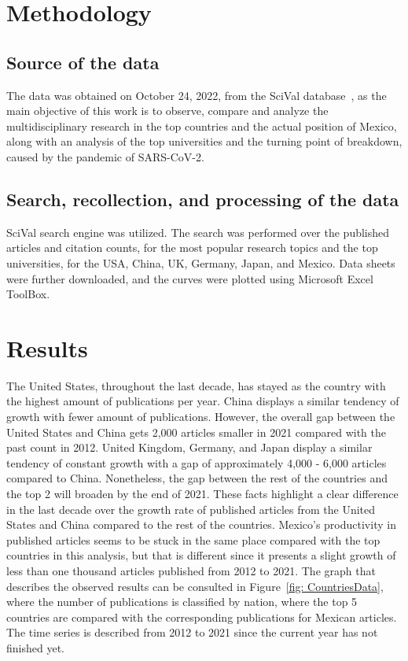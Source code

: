 \documentclass[conference]{IEEEtran}
\begin{document}
\section{Methodology}
\label{sec:Methodology}
\subsection{Source of the data}
The data was obtained on October 24, 2022, from the SciVal database~\cite{Scival2022}, as the main objective of this work is to observe, compare and analyze the multidisciplinary research in the top countries and the actual position of Mexico, along with an analysis of the top universities and the turning point of breakdown, caused by the pandemic of SARS-CoV-2.
\subsection{Search, recollection, and processing of the data}
SciVal search engine was utilized. The search was performed over the published articles and citation counts, for the most popular research topics and the top universities, for the USA, China, UK, Germany, Japan, and Mexico. Data sheets were further downloaded, and the curves were plotted using Microsoft Excel ToolBox.


\section{Results}
\label{sec:Results}
The United States, throughout the last decade, has stayed as the country with the highest amount of publications per year. China displays a similar tendency of growth with fewer amount of publications. However, the overall gap between the United States and China gets 2,000 articles smaller in 2021 compared with the past count in 2012. United Kingdom, Germany, and Japan display a similar tendency of constant growth with a gap of approximately 4,000 - 6,000 articles compared to China. Nonetheless, the gap between the rest of the countries and the top 2 will broaden by the end of 2021. These facts highlight a clear difference in the last decade over the growth rate of published articles from the United States and China compared to the rest of the countries. Mexico's productivity in published articles seems to be stuck in the same place compared with the top countries in this analysis, but that is different since it presents a slight growth of less than one thousand articles published from 2012 to 2021. The graph that describes the observed results can be consulted in Figure~\ref{fig: CountriesData}, where the number of publications is classified by nation, where the top 5 countries are compared with the corresponding publications for Mexican articles. The time series is described from 2012 to 2021 since the current year has not finished yet.
\end{document}
